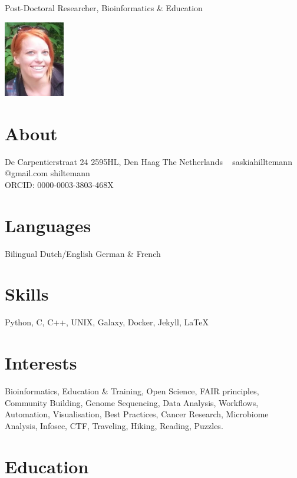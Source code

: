 \documentclass[]{shiltemann-cv}
\begin{document}
       {Post-Doctoral Researcher, Bioinformatics \& Education}


\begin{aside}
  \includegraphics[width=75pt]{foto.jpg}
  \section{About}
    De Carpentierstraat 24
    2595HL, Den Haag
    The Netherlands
    ~
    saskiahilltemann @gmail.com \faEnvelope
    shiltemann \faGithub \ \faTwitter \ \faLinkedin
    \
    \ \\
    ORCID:
    0000-0003-3803-468X \faOrcid
  \section{Languages}
    Bilingual Dutch/English
    German \& French
  \section{Skills}
    Python, C, C++, UNIX, Galaxy, Docker, Jekyll, LaTeX
\end{aside}

\section{Interests}

Bioinformatics, Education \& Training, Open Science, FAIR principles, Community Building, Genome Sequencing, Data Analysis, Workflows, Automation, Visualisation, Best Practices, Cancer Research, Microbiome Analysis, Infosec, CTF, Traveling, Hiking, Reading, Puzzles.

\section{Education}
\end{document}
